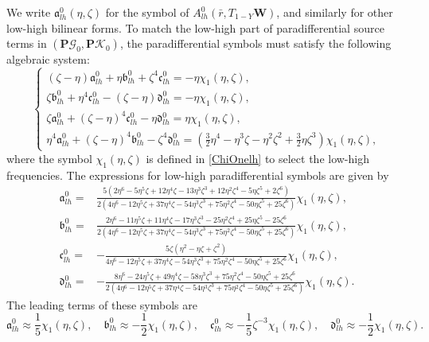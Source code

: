 \documentclass[10pt]{amsart}
\theoremstyle{remark}
\theoremstyle{definition}
\numberwithin{equation}{section}
\newcommand{\f}{\frac}
\newcommand{\bw}{\mathbf{W}}
\newcommand{\nP}{{\mathbf P}}
\begin{document}
We write $\mathfrak{a}^0_{lh}(\eta, \zeta)$ for the symbol of $A^0_{lh}(\bar{r}, T_{1-Y}\bw)$, and similarly for other low-high bilinear forms.
To match the low-high part of paradifferential source terms in $(\nP\mathcal{G}_0, \nP\mathcal{K}_0)$, the paradifferential symbols must satisfy the following algebraic system:
\begin{equation*}
\begin{cases}
(\zeta-\eta)\mathfrak{a}^0_{lh}+\eta\mathfrak{b}^0_{lh}+\zeta^4\mathfrak{c}^0_{lh}=-\eta\chi_{1}(\eta, \zeta),\\
\zeta\mathfrak{b}^0_{lh}+\eta^4\mathfrak{c}^0_{lh}-(\zeta-\eta)\mathfrak{d}^0_{lh}=-\eta\chi_{1}(\eta, \zeta),\\
\zeta\mathfrak{a}^0_{lh}+(\zeta-\eta)^4\mathfrak{c}^0_{lh}-\eta\mathfrak{d}^0_{lh}=\eta\chi_{1}(\eta, \zeta),\\
\eta^4 \mathfrak{a}^0_{lh}+(\zeta-\eta)^4\mathfrak{b}^0_{lh}-\zeta^4\mathfrak{d}^0_{lh}=\left(\f32\eta^4-\eta^3\zeta-\eta^2\zeta^2+\f32\eta\zeta^3\right)\chi_{1}(\eta, \zeta),
\end{cases}
\end{equation*}
where  the symbol $\chi_{1}(\eta, \zeta)$ is defined in \eqref{ChiOnelh} to select the low-high frequencies.
The expressions for low-high paradifferential symbols are given by
\begin{align*}
\mathfrak{a}^0_{lh}=&\f{5(2\eta^6-5\eta^5\zeta+12\eta^4\zeta-13\eta^3\zeta^3+12\eta^2\zeta^4-5\eta\zeta^5+2\zeta^6)}{2(4\eta^6-12\eta^5\zeta+37\eta^4\zeta-54\eta^3\zeta^3+75\eta^2\zeta^4-50\eta\zeta^5+25\zeta^6)}\chi_{1}(\eta, \zeta),\\
\mathfrak{b}^0_{lh}=&\f{2\eta^6-11\eta^5\zeta+11\eta^4\zeta-17\eta^3\zeta^3-25\eta^2\zeta^4+25\eta\zeta^5-25\zeta^6}{2(4\eta^6-12\eta^5\zeta+37\eta^4\zeta-54\eta^3\zeta^3+75\eta^2\zeta^4-50\eta\zeta^5+25\zeta^6)}\chi_{1}(\eta, \zeta),\\
\mathfrak{c}^0_{lh}=&-\f{5\zeta(\eta^2-\eta\zeta+\zeta^2)}{4\eta^6-12\eta^5\zeta+37\eta^4\zeta-54\eta^3\zeta^3+75\eta^2\zeta^4-50\eta\zeta^5+25\zeta^6}\chi_{1}(\eta, \zeta),\\
\mathfrak{d}^0_{lh}=&-\f{8\eta^6-24\eta^5\zeta+49\eta^4\zeta-58\eta^3\zeta^3+75\eta^2\zeta^4-50\eta\zeta^5+25\zeta^6}{2(4\eta^6-12\eta^5\zeta+37\eta^4\zeta-54\eta^3\zeta^3+75\eta^2\zeta^4-50\eta\zeta^5+25\zeta^6)}\chi_{1}(\eta, \zeta).
\end{align*}
The leading terms of these symbols are
\begin{equation*}
\mathfrak{a}^0_{lh} \approx\f15\chi_{1}(\eta, \zeta), \quad \mathfrak{b}^0_{lh} \approx -\f12\chi_{1}(\eta, \zeta),  \quad \mathfrak{c}^0_{lh} \approx -\f15\zeta^{-3}\chi_{1}(\eta, \zeta), \quad \mathfrak{d}^0_{lh} \approx -\f12\chi_{1}(\eta, \zeta).   
\end{equation*}
\end{document}
